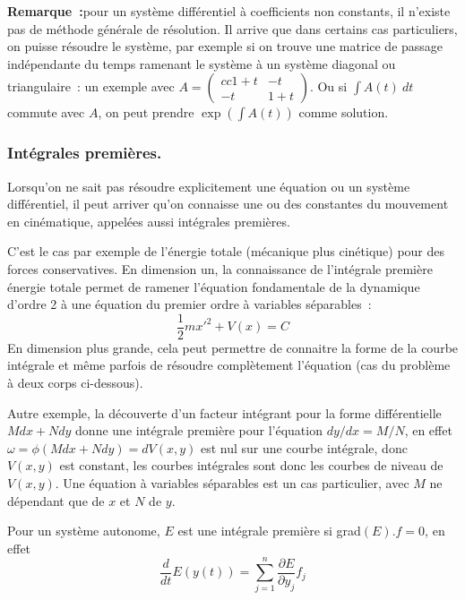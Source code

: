 \documentclass[a4paper,11pt]{article}
\begin{document}
\begin{giacjshere}
{\bf Remarque~:}pour un syst\`eme diff\'erentiel \`a coefficients
non constants, il n'existe pas de m\'ethode g\'en\'erale de
r\'esolution. Il arrive que dans certains cas particuliers,
on puisse r\'esoudre le syst\`eme, par exemple si on trouve
une matrice de passage ind\'ependante du temps ramenant
le syst\`eme \`a un syst\`eme diagonal ou triangulaire~:
un exemple avec
$A=\left(\begin{matrix}{cc} 1+t & -t \\ -t & 1+t\end{matrix}\right)$.
Ou si $\int A(t) \ dt$ commute avec $A$, on peut prendre 
$\exp(\int A(t))$ comme solution.

\subsubsection{Int\'egrales premi\`eres.}
Lorsqu'on ne sait pas r\'esoudre explicitement une \'equation
ou un syst\`eme diff\'erentiel, il peut arriver qu'on connaisse
une ou des constantes du mouvement en cin\'ematique, appel\'ees
aussi int\'egrales premi\`eres. 

C'est le cas par exemple de
l'\'energie totale (m\'ecanique plus cin\'etique) pour des forces
conservatives.  En dimension un, la connaissance de l'int\'egrale 
premi\`ere \'energie
totale permet de ramener l'\'equation fondamentale de la
dynamique d'ordre 2 \`a une \'equation
du premier ordre \`a variables s\'eparables~:
$$ \frac12 m x'^2+ V(x) = C $$
En dimension plus grande, cela peut permettre de 
connaitre la forme de la courbe int\'egrale et m\^eme
parfois de r\'esoudre compl\`etement l'\'equation (cas du probl\`eme
\`a deux corps ci-dessous).
 
Autre exemple, la d\'ecouverte d'un facteur 
int\'egrant pour la forme diff\'erentielle $Mdx+Ndy$
donne une int\'egrale premi\`ere pour l'\'equation $dy/dx=M/N$,
en effet $\omega=\phi(Mdx+Ndy)=dV(x,y)$ est nul
sur une courbe int\'egrale, donc $V(x,y)$
est constant, les courbes int\'egrales sont donc 
les courbes de niveau de $V(x,y)$. Une \'equation \`a variables
s\'eparables est un cas particulier, avec $M$ ne d\'ependant que de
$x$ et $N$ de $y$.

Pour un syst\`eme autonome, $E$ est une int\'egrale premi\`ere si
grad$(E).f=0$, en effet
$$ \frac{d}{dt} E(y(t))= \sum_{j=1}^n \frac{\partial E}{\partial y_j} f_j$$


\end{giacjshere}
\end{document}
